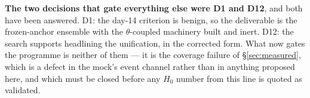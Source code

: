 \documentclass[11pt]{article}
\theoremstyle{definition}
\theoremstyle{remark}
\begin{document}
\vspace{0.6em}
\noindent\textbf{The two decisions that gate everything else were D1 and D12},
and both have been answered. D1: the day-14 criterion is benign, so the deliverable
is the frozen-anchor ensemble with the $\theta$-coupled machinery built and inert.
D12: the search supports headlining the unification, in the corrected form. What
now gates the programme is neither of them --- it is the coverage failure of
\S\ref{sec:measured}, which is a defect in the mock's event channel rather than in
anything proposed here, and which must be closed before any $H_0$ number from this
line is quoted as validated.
\end{document}
